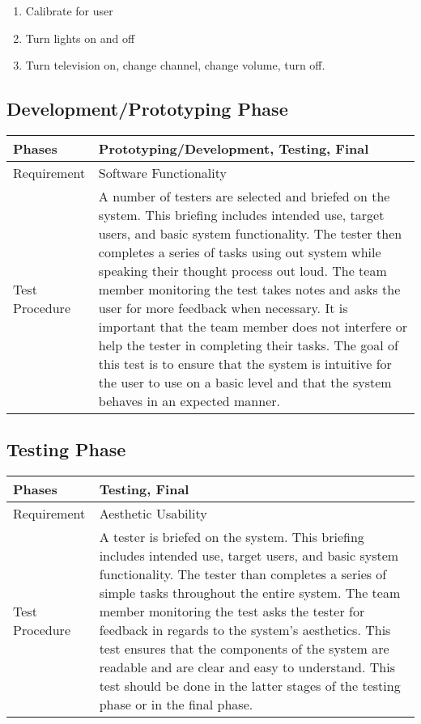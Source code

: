 \documentclass{article}
\begin{document}
\begin{enumerate}
	\item Calibrate for user
	\item Turn lights on and off
	\item Turn television on, change channel, change volume, turn off.
\end{enumerate}

\subsection{Development/Prototyping Phase}
\begin{tabular}{| l | p{12cm}  |}
    \hline
	Phases & Prototyping/Development, Testing, Final \\ \hline
	Requirement & Software Functionality \\ \hline
	Test Procedure & A number of testers are selected and briefed on the
	system. This briefing includes intended use, target users, and basic
	system functionality. The tester then completes a series of tasks using
	out system while speaking their thought process out loud. The team member
	monitoring the test takes notes and asks the user for more feedback when
	necessary. It is important that the team member does not interfere or help
	the tester in completing their tasks. The goal of this test is to ensure
	that the system is intuitive for the user to use on a basic level and that
	the system behaves in an expected manner.
	\\ \hline
\end{tabular}

\subsection{Testing Phase}
\begin{tabular}{| l | p{12cm}  |}
    \hline
	Phases & Testing, Final \\ \hline
	Requirement & Aesthetic Usability \\ \hline
	Test Procedure & A tester is briefed on the system. This briefing includes
	intended use, target users, and basic system functionality. The tester
	than completes a series of simple tasks throughout the entire system. The
	team member monitoring the test asks the tester for feedback in regards to
	the system's aesthetics. This test ensures that the components of the
	system are readable and are clear and easy to understand. This test should
	be done in the latter stages of the testing phase or in the final phase.
	\\ \hline
\end{tabular}
\end{document}
